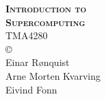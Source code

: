 \documentclass[onecolumn, twoside, a4paper, 11pt]{memoir}
\begin{document}
\begin{titlingpage}
  \centering
  {\Huge \bfseries \scshape
    Introduction to \\[0.2\baselineskip] Supercomputing} \\[2\baselineskip]
  {\Large TMA4280} \\[0.7\textheight]
  \copyright \\
  Einar R{\o}nquist \\
  Arne Morten Kvarving \\
  Eivind Fonn
\end{titlingpage}










% 
% 


% 




\end{document}
